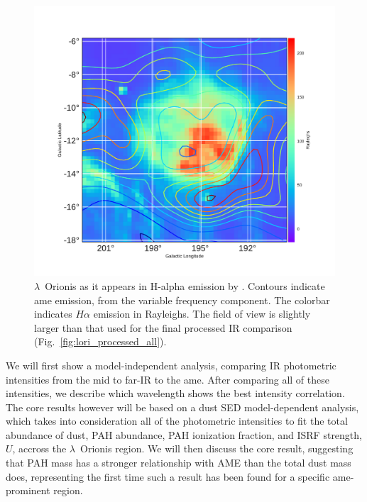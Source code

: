      \begin{figure}
       \includegraphics[width=\textwidth]{../Plots/ch_lori/LOri_halpha_AMEvarContours.pdf}
       \centering
       \caption{$\lambda$~Orionis as it appears in H-alpha emission by \cite{finkbeiner03}. Contours indicate \acrshort{ame} emission, from the variable frequency component. The colorbar indicates $H\alpha$ emission in Rayleighs. The field of view is slightly larger than that used for the final processed IR comparison (Fig.~\ref{fig:lori_processed_all}). }
       \label{fig:LOri_halpha_AMEvarContours}
     \end{figure}
    We will first show a model-independent analysis, comparing IR photometric intensities from the mid to far-IR to the \acrshort{ame}. After comparing all of these intensities, we describe which wavelength shows the best intensity correlation. The core results however will be based on a dust SED model-dependent analysis, which takes into consideration all of the photometric intensities to fit the total abundance of dust, PAH abundance, PAH ionization fraction, and ISRF strength, $U$, accross the $\lambda$~Orionis region. We will then discuss the core result, suggesting that PAH mass has a stronger relationship with AME than the total dust mass does, representing the first time such a result has been found for a specific \acrshort{ame}-prominent region.


